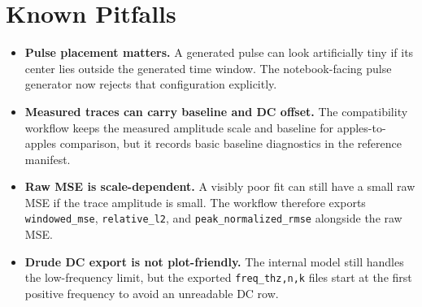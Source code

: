 \documentclass[11pt]{article}
\begin{document}
\section{Known Pitfalls}
\begin{itemize}[leftmargin=2em]
\item \textbf{Pulse placement matters.} A generated pulse can look artificially tiny if its center
lies outside the generated time window. The notebook-facing pulse generator now rejects that
configuration explicitly.
\item \textbf{Measured traces can carry baseline and DC offset.} The compatibility workflow keeps
the measured amplitude scale and baseline for apples-to-apples comparison, but it records basic
baseline diagnostics in the reference manifest.
\item \textbf{Raw MSE is scale-dependent.} A visibly poor fit can still have a small raw MSE if the
trace amplitude is small. The workflow therefore exports \texttt{windowed\_mse},
\texttt{relative\_l2}, and \texttt{peak\_normalized\_rmse} alongside the raw MSE.
\item \textbf{Drude DC export is not plot-friendly.} The internal model still handles the low-frequency
limit, but the exported \texttt{freq\_thz,n,k} files start at the first positive frequency to avoid
an unreadable DC row.
\end{itemize}
\end{document}
